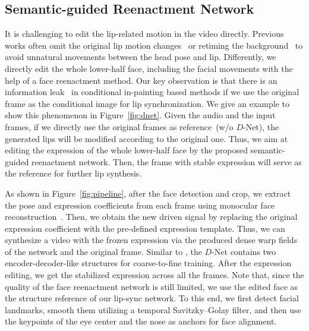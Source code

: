 \subsection{Semantic-guided Reenactment Network}
\label{sec:pirender}
It is challenging to edit the lip-related motion in the video directly.
Previous works often omit the original lip motion changes~\cite{wav2lip} or retiming the background~\cite{obama,song2022everybody} to avoid unnatural movements between the head pose and lip.
Differently, we directly edit the whole lower-half face, including the facial movements with the help of a face reenactment method. 
Our key observation is that there is an information leak~\cite{lipgan,wav2lip} in conditional in-painting based methods if we use the original frame as the conditional image for lip synchronization. 
We give an example to show this phenomenon in Figure~\ref{fig:dnet}. 
Given the audio and the input frames, if we directly use the original frames as reference~(w/o $D$-Net), the generated lips will be modified according to the original one. 
Thus, we aim at editing the expression of the whole lower-half face by the proposed semantic-guided reenactment network. 
Then, the frame with stable expression will serve as the reference for further lip synthesis. 

As shown in Figure~\ref{fig:pipeline}, after the face detection and crop, we extract the pose and expression coefficients from each frame using monocular face reconstruction~\cite{face3d}. 
Then, we obtain the new driven signal by replacing the original expression coefficient with the pre-defined expression template. 
Thus, we can synthesize a video with the frozen expression via the produced dense warp fields of the network and the original frame. 
Similar to \cite{pirender}, the ${D}$-Net contains two encoder-decoder-like structures for coarse-to-fine training. After the expression editing, we get the stabilized expression across all the frames. Note that, since the quality of the face reenactment network is still limited, we use the edited face as the structure reference of our lip-sync network. To this end, we first detect facial landmarks, smooth them utilizing a temporal Savitzky–Golay filter, and then use the keypoints of the eye center and the nose as anchors for face alignment.


